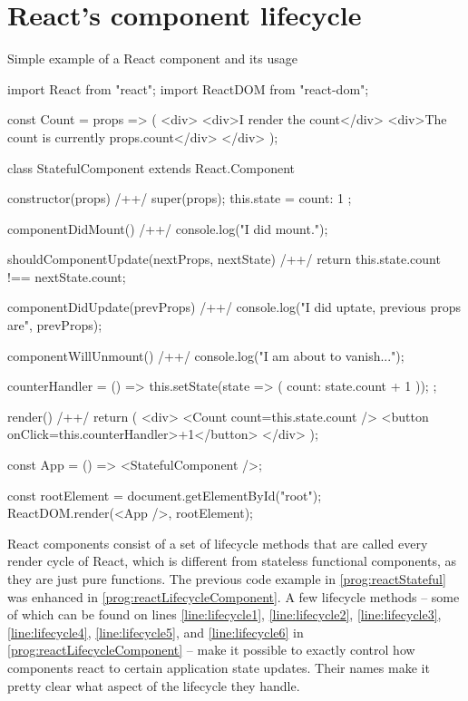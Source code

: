 \section{React's component lifecycle}

\begin{program}
\caption{Simple example of a React component and its usage} 
\label{prog:reactLifecycleComponent}
\begin{JsCode}
import React from "react";
import ReactDOM from "react-dom";

const Count = props => (
  <div>
    <div>I render the count</div>
    <div>The count is currently {props.count}</div>
  </div>
);

class StatefulComponent extends React.Component {
  constructor(props) { /+\label{line:lifecycle1}+/
    super(props);
    this.state = {
      count: 1
    };
  }

  componentDidMount() { /+\label{line:lifecycle2}+/
    console.log("I did mount.");
  }

  shouldComponentUpdate(nextProps, nextState) { /+\label{line:lifecycle3}+/
    return this.state.count !== nextState.count;
  }

  componentDidUpdate(prevProps) { /+\label{line:lifecycle4}+/
    console.log("I did uptate, previous props are", prevProps);
  }

  componentWillUnmount() { /+\label{line:lifecycle5}+/
    console.log("I am about to vanish...");
  }

  counterHandler = () => {
    this.setState(state => ({ count: state.count + 1 }));
  };

  render() { /+\label{line:lifecycle6}+/
    return (
      <div>
        <Count count={this.state.count} />
        <button onClick={this.counterHandler}>+1</button>
      </div>
    );
  }
}
  
const App = () => <StatefulComponent />;

const rootElement = document.getElementById("root");
ReactDOM.render(<App />, rootElement);  
\end{JsCode}
\end{program}

React components consist of a set of lifecycle methods that are called every render cycle of React, which is different from stateless functional components, as they are just pure functions. The previous code example in \ref{prog:reactStateful} was enhanced in \ref{prog:reactLifecycleComponent}. A few lifecycle methods -- some of which can be found on lines \ref{line:lifecycle1}, \ref{line:lifecycle2}, \ref{line:lifecycle3}, \ref{line:lifecycle4}, \ref{line:lifecycle5}, and \ref{line:lifecycle6} in \ref{prog:reactLifecycleComponent} -- make it possible to exactly control how components react to certain application state updates. Their names make it pretty clear what aspect of the lifecycle they handle.

